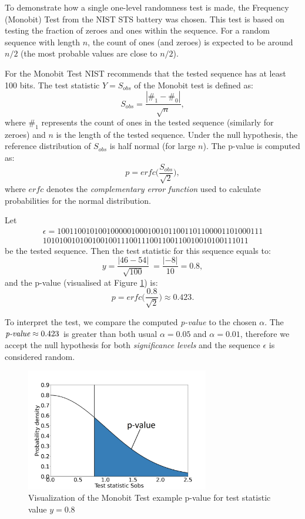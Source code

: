 \documentclass[
  digital,     %
  oneside,     %
  nosansbold,  %
  nocolorbold, %
  nolof,         %
  nolot,         %
]{fithesis4}
\begin{document}
To demonstrate how a single one-level randomness test is made, the Frequency (Monobit) Test \cite[p. 2-2]{nist_special} from the NIST STS battery was chosen.  This test is based on testing the fraction of zeroes and ones within the sequence. For a random sequence with length $n$, the count of ones (and zeroes) is expected to be around $n/2$ (the most probable values are close to $n/2$). 

For the Monobit Test NIST recommends that the tested sequence has at least 100 bits. The test statistic $Y=S_{obs}$ of the Monobit test is defined as:
\[S_{obs} = \dfrac{|\#_1 - \#_0|}{\sqrt{n}},\]
where $\#_1$ represents the count of ones in the tested sequence (similarly for zeroes) and $n$ is the length of the tested sequence. Under the null hypothesis, the reference distribution of $S_{obs}$ is half normal (for large $n$). The p-value is computed as:
\[ p = erfc\biggl(\dfrac{S_{obs}}{\sqrt{2}}\biggr),\]
where $erfc$ denotes the \emph{complementary error function} used to calculate probabilities for the normal distribution.

 Let
\[\begin{split}
    \epsilon = 10011001010010000010001001011001101100001101000111\\10101001010010010011100111001100110010010100111011
\end{split}\]
 be the tested sequence. Then the test statistic for this sequence equals to:
 \[y = \dfrac{|46 - 54|}{\sqrt{100}}\ = \dfrac{|-8|}{10} = 0.8,\]
 and the p-value (visualised at Figure \ref{fig:example}) is: 
 \[p = erfc\biggl(\dfrac{0.8}{\sqrt{2}}\biggr) \approx 0.423.\]

To interpret the test, we compare the computed \emph{p-value} to the chosen $\alpha$. The $\emph{p-value} \approx 0.423$ is greater than both usual $\alpha = 0.05$ and $\alpha = 0.01$, therefore we accept the null hypothesis for both \emph{significance levels} and the sequence $\epsilon$ is considered random.

\begin{figure}[H]
  \begin{center}
    \includegraphics[width=8cm]{figures/test_example.png}
  \end{center}
  \caption{Visualization of the Monobit Test example p-value for test statistic value $y = 0.8$}
  \label{fig:example}
\end{figure}
\end{document}
